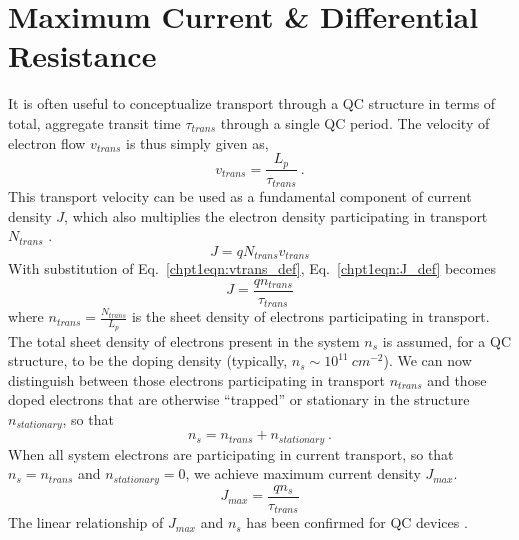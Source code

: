 \documentclass[12pt]{report}
\begin{document}
{\section{Maximum Current \& Differential Resistance}

It is often useful to conceptualize transport through a QC structure in terms of total, aggregate transit time $\tau_{trans}$ through a single QC period.  The velocity of electron flow $v_{trans}$ is thus simply given as,
\begin{equation}
\label{chpt1eqn:vtrans_def}
v_{trans}=\frac{L_p}{\tau_{trans}} {~.}
\end{equation}
This transport velocity can be used as a fundamental component of current density $J$, which also multiplies the electron density participating in transport $N_{trans}$  \cite{Sze}.
\begin{equation}
\label{chpt1eqn:J_def}
J = q N_{trans} v_{trans}
\end{equation}
With substitution of Eq.~\eqref{chpt1eqn:vtrans_def}, Eq.~\eqref{chpt1eqn:J_def} becomes
\begin{equation}
J = \frac{q n_{trans}}{\tau_{trans}}
\end{equation}
where $n_{trans} = \frac{N_{trans}}{L_p}$  is the sheet density of electrons participating in transport.  The total sheet density of electrons present in the system $n_s$ is assumed, for a QC structure, to be the doping density (typically, $n_s\sim10^{11}~{cm}^{-2}$).  We can now distinguish between those electrons participating in transport $n_{trans}$ and those doped electrons that are otherwise ``trapped'' or stationary in the structure $n_{stationary}$, so that
\begin{equation}
n_s = n_{trans}+n_{stationary} {~.}
\end{equation}
When all system electrons are participating in current transport, so that $n_s=n_{trans}$ and $n_{stationary}=0$, we achieve maximum current density $J_{max}$.
\begin{equation}
J_{max}=\frac{q n_s}{\tau_{trans}}
\end{equation}
The linear relationship of $J_{max}$ and $n_s$ has been confirmed for QC devices \cite{Aellen:JAP:2006} \cite{Howard:APL:2008}.

}
\end{document}

